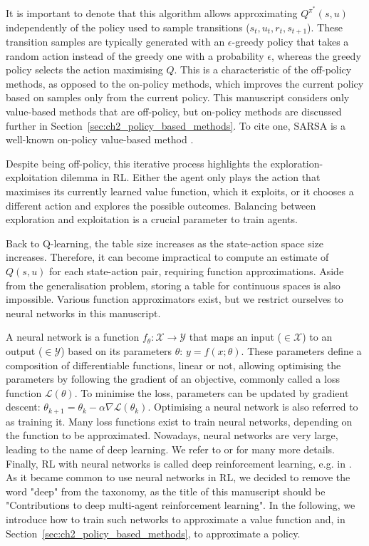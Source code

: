 It is important to denote that this algorithm allows approximating $Q^{\pi^*}(s, u)$ independently of the policy used to sample transitions ($s_t, u_t, r_t, s_{t+1}$).
These transition samples are typically generated with an $\epsilon$-greedy policy that takes a random action instead of the greedy one with a probability $\epsilon$, whereas the greedy policy selects the action maximising $Q$.
This is a characteristic of the off-policy methods, as opposed to the on-policy methods, which improves the current policy based on samples only from the current policy.
This manuscript considers only value-based methods that are off-policy, but on-policy methods are discussed further in Section~\ref{sec:ch2_policy_based_methods}.
To cite one, SARSA is a well-known on-policy value-based method \citep{sutton2018reinforcement}.

Despite being off-policy, this iterative process highlights the exploration-exploitation dilemma in RL.
Either the agent only plays the action that maximises its currently learned value function, which it exploits, or it chooses a different action and explores the possible outcomes.
Balancing between exploration and exploitation is a crucial parameter to train agents.

Back to Q-learning, the table size increases as the state-action space size increases.
Therefore, it can become impractical to compute an estimate of $Q(s, u)$ for each state-action pair, requiring function approximations.
Aside from the generalisation problem, storing a table for continuous spaces is also impossible.
Various function approximators exist, but we restrict ourselves to neural networks in this manuscript.

A neural network is a function $f_\theta: \mathcal{X} \rightarrow \mathcal{Y}$ that maps an input ($\in\mathcal{X}$) to an output ($\in\mathcal{Y}$) based on its parameters $\theta$: $y = f(x;\theta)$.
These parameters define a composition of differentiable functions, linear or not, allowing optimising the parameters by following the gradient of an objective, commonly called a loss function $\mathcal{L}(\theta)$.
To minimise the loss, parameters can be updated by gradient descent: $\theta_{k+1} = \theta_k - \alpha \nabla \mathcal{L}(\theta_k)$.
Optimising a neural network is also referred to as training it.
Many loss functions exist to train neural networks, depending on the function to be approximated.
Nowadays, neural networks are very large, leading to the name of deep learning.
We refer to \citep{zhang2023dive} or \citep{prince2023understanding} for many more details.
Finally, RL with neural networks is called deep reinforcement learning, e.g. in \citep{introDeepRL}.
As it became common to use neural networks in RL, we decided to remove the word "deep" from the taxonomy, as the title of this manuscript should be "Contributions to deep multi-agent reinforcement learning".
In the following, we introduce how to train such networks to approximate a value function and, in Section~\ref{sec:ch2_policy_based_methods}, to approximate a policy.

